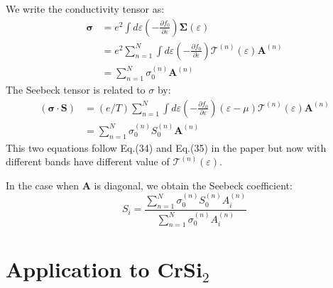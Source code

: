 \documentclass{article}
\newcommand{\pfrac}[2]{\frac{\partial #1}{\partial #2}}
\begin{document}
We write the conductivity tensor as:
\begin{align}
    \mathbf{\sigma} &= e^2\int d\varepsilon \left( -\pfrac{f_0}{\varepsilon} \right) \mathbf{\Sigma}(\varepsilon) \\
            &= e^2 \sum_{n=1}^N \int d\varepsilon \left( -\pfrac{f_0}{\varepsilon} \right) \mathcal{T}^{(n)}(\varepsilon) \mathbf{A}^{(n)} \\
            &= \sum_{n=1}^N \sigma_0^{(n)} \mathbf{A}^{(n)}
\end{align}
The Seebeck tensor is related to $\sigma$ by:
\begin{align}
    \mathbf{(\sigma \cdot S)} &= (e/T) \sum_{n=1}^N \int d\varepsilon 
            \left(-\pfrac{f_0}{\varepsilon}\right)(\varepsilon - \mu) \mathcal{T}^{(n)}(\varepsilon) \mathbf{A}^{(n)} \\
        &= \sum_{n=1}^N \sigma_0^{(n)} S_0^{(n)} \mathbf{A}^{(n)}
\end{align}
This two equations follow Eq.(34) and Eq.(35) in the paper but now with different 
bands have different value of $\mathcal{T}^{(n)}(\varepsilon)$. 

In the case when $\mathbf{A}$ is diagonal, we obtain the Seebeck coefficient:
\begin{equation}
    S_i = \frac{\sum_{n=1}^N \sigma_0^{(n)} S_0^{(n)} A_i^{(n)}}{\sum_{n=1}^N \sigma_0^{(n)} A_i^{(n)}}
\end{equation}

\section{Application to CrSi$_2$}
\end{document}
